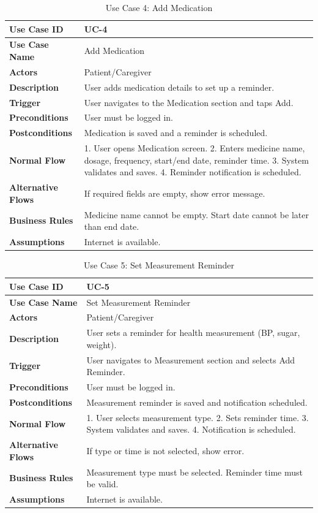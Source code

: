 \begin{table}[H]
\centering
\caption{Use Case 4: Add Medication}
\begin{tabularx}{\textwidth}{|l|X|}
\hline
\textbf{Use Case ID} & UC-4 \\ \hline
\textbf{Use Case Name} & Add Medication \\ \hline
\textbf{Actors} & Patient/Caregiver \\ \hline
\textbf{Description} & User adds medication details to set up a reminder. \\ \hline
\textbf{Trigger} & User navigates to the Medication section and taps Add. \\ \hline
\textbf{Preconditions} & User must be logged in. \\ \hline
\textbf{Postconditions} & Medication is saved and a reminder is scheduled. \\ \hline
\textbf{Normal Flow} & 1. User opens Medication screen. 2. Enters medicine name, dosage, frequency, start/end date, reminder time. 3. System validates and saves. 4. Reminder notification is scheduled. \\ \hline
\textbf{Alternative Flows} & If required fields are empty, show error message. \\ \hline
\textbf{Business Rules} & Medicine name cannot be empty. Start date cannot be later than end date. \\ \hline
\textbf{Assumptions} & Internet is available. \\ \hline
\end{tabularx}
\end{table}

\begin{table}[H]
\centering
\caption{Use Case 5: Set Measurement Reminder}
\begin{tabularx}{\textwidth}{|l|X|}
\hline
\textbf{Use Case ID} & UC-5 \\ \hline
\textbf{Use Case Name} & Set Measurement Reminder \\ \hline
\textbf{Actors} & Patient/Caregiver \\ \hline
\textbf{Description} & User sets a reminder for health measurement (BP, sugar, weight). \\ \hline
\textbf{Trigger} & User navigates to Measurement section and selects Add Reminder. \\ \hline
\textbf{Preconditions} & User must be logged in. \\ \hline
\textbf{Postconditions} & Measurement reminder is saved and notification scheduled. \\ \hline
\textbf{Normal Flow} & 1. User selects measurement type. 2. Sets reminder time. 3. System validates and saves. 4. Notification is scheduled. \\ \hline
\textbf{Alternative Flows} & If type or time is not selected, show error. \\ \hline
\textbf{Business Rules} & Measurement type must be selected. Reminder time must be valid. \\ \hline
\textbf{Assumptions} & Internet is available. \\ \hline
\end{tabularx}
\end{table}

